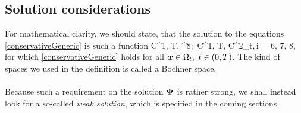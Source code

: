 \subsection{Solution considerations}
For mathematical clarity, we should state, that the solution to the equations \ref{conservativeGeneric} is such a function
\be
\label{HardSln} \mrPsi\in C^1\lo{}, T\ro, ^8\ro;\ \mrPsii\in C^1\lo{}, T\ro, C^2\lo\Omega_{t}\ro\ro,\,i = 6, 7, 8,
\ee
for which \ref{conservativeGeneric} holds for all $\mbox{\boldmath $x$}\in\Omega_t,\ t\in\left( 0, T\right)$. The kind of spaces we used in the definition is called a Bochner space.
\paragraph{}
Because such a requirement on the solution $\mathrm{\mathbf{\Psi}}$ is rather strong, we shall instead look for a so-called \textit{weak solution}, which is specified in the coming sections.
